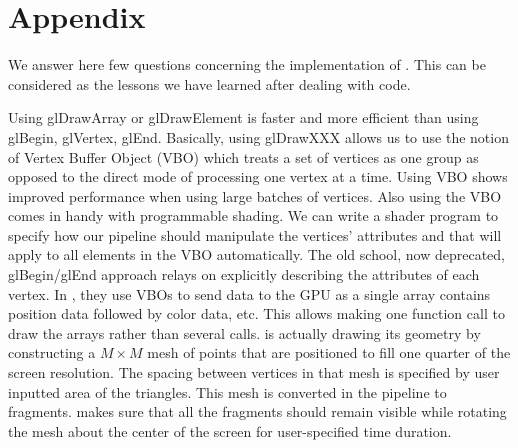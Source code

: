 \section*{Appendix}
We answer here few questions concerning the implementation of \protect{\wes}. This can be considered as the lessons we have learned after dealing with \protect{\wes} code.

Using glDrawArray or glDrawElement is faster and more efficient than using glBegin, glVertex, glEnd. Basically, using glDrawXXX allows us to use the notion of Vertex Buffer Object (VBO) which treats a set of vertices as one group as opposed to the direct mode of processing one vertex at a time. Using VBO shows improved performance when using large batches of vertices. Also using the VBO comes in handy with programmable shading. We can write a shader program to specify how our pipeline should manipulate the vertices’ attributes and that will apply to all elements in the VBO automatically. The old school, now deprecated, glBegin/glEnd approach relays on explicitly describing the attributes of each vertex. In \protect{\wes}, they use VBOs to send data to the GPU as a single array contains position data followed by color data, etc. This allows making one function call to draw the arrays rather than several calls.
\protect{\wes} is actually drawing its geometry by constructing a $M\times M$ mesh of points that are positioned to fill one quarter of the screen resolution. The spacing between vertices in that mesh is specified by user inputted area of the triangles. This mesh is converted in the pipeline to fragments. \protect{\wes} makes sure that all the fragments should remain visible while rotating the mesh about the center of the screen for user-specified time duration.

